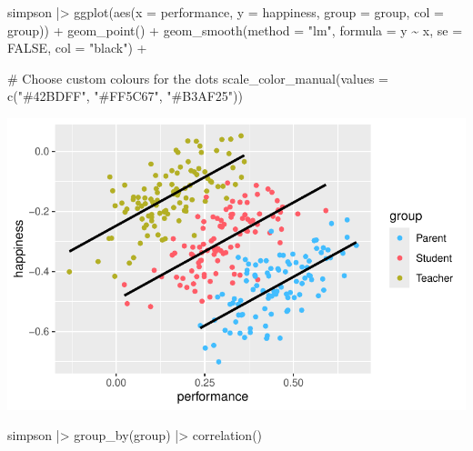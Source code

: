 \documentclass[
  letterpaper,
]{krantz}
\makeatletter
\newenvironment{Shaded}{\begin{snugshade}}{\end{snugshade}}
\newcommand{\AttributeTok}[1]{\textcolor[rgb]{0.40,0.45,0.13}{#1}}
\newcommand{\CommentTok}[1]{\textcolor[rgb]{0.37,0.37,0.37}{#1}}
\newcommand{\ConstantTok}[1]{\textcolor[rgb]{0.56,0.35,0.01}{#1}}
\newcommand{\FunctionTok}[1]{\textcolor[rgb]{0.28,0.35,0.67}{#1}}
\newcommand{\NormalTok}[1]{\textcolor[rgb]{0.00,0.23,0.31}{#1}}
\newcommand{\SpecialCharTok}[1]{\textcolor[rgb]{0.37,0.37,0.37}{#1}}
\newcommand{\StringTok}[1]{\textcolor[rgb]{0.13,0.47,0.30}{#1}}
\newenvironment{kframe}{%
\medskip{}
\setlength{\fboxsep}{.8em}
 \def\at@end@of@kframe{}%
 \ifinner\ifhmode%
  \def\at@end@of@kframe{\end{minipage}}%
  \begin{minipage}{\columnwidth}%
 \fi\fi%
 \def\FrameCommand##1{\hskip\@totalleftmargin \hskip-\fboxsep
 \colorbox{shadecolor}{##1}\hskip-\fboxsep
     \hskip-\linewidth \hskip-\@totalleftmargin \hskip\columnwidth}%
 \MakeFramed {\advance\hsize-\width
   \@totalleftmargin\z@ \linewidth\hsize
   \@setminipage}}%
 {\par\unskip\endMakeFramed%
 \at@end@of@kframe}
\renewenvironment{Shaded}{\begin{kframe}}{\end{kframe}}
\makeatother
\begin{document}
\begin{Shaded}
\begin{Highlighting}[]
\NormalTok{simpson }\SpecialCharTok{|\textgreater{}}
  \FunctionTok{ggplot}\NormalTok{(}\FunctionTok{aes}\NormalTok{(}\AttributeTok{x =}\NormalTok{ performance,}
             \AttributeTok{y =}\NormalTok{ happiness,}
             \AttributeTok{group =}\NormalTok{ group,}
             \AttributeTok{col =}\NormalTok{ group)) }\SpecialCharTok{+}
  \FunctionTok{geom\_point}\NormalTok{() }\SpecialCharTok{+}
  \FunctionTok{geom\_smooth}\NormalTok{(}\AttributeTok{method =} \StringTok{"lm"}\NormalTok{,}
              \AttributeTok{formula =}\NormalTok{ y }\SpecialCharTok{\textasciitilde{}}\NormalTok{ x,}
              \AttributeTok{se =} \ConstantTok{FALSE}\NormalTok{,}
              \AttributeTok{col =} \StringTok{"black"}\NormalTok{) }\SpecialCharTok{+}

  \CommentTok{\# Choose custom colours for the dots}
  \FunctionTok{scale\_color\_manual}\NormalTok{(}\AttributeTok{values =} \FunctionTok{c}\NormalTok{(}\StringTok{"\#42BDFF"}\NormalTok{, }\StringTok{"\#FF5C67"}\NormalTok{, }\StringTok{"\#B3AF25"}\NormalTok{))}
\end{Highlighting}
\end{Shaded}

\includegraphics{10_correlations_files/figure-pdf/simpson-paradox-plot-groups-1.pdf}

\begin{Shaded}
\begin{Highlighting}[]
\NormalTok{simpson }\SpecialCharTok{|\textgreater{}}
  \FunctionTok{group\_by}\NormalTok{(group) }\SpecialCharTok{|\textgreater{}}
  \FunctionTok{correlation}\NormalTok{()}
\end{Highlighting}
\end{Shaded}
\end{document}
